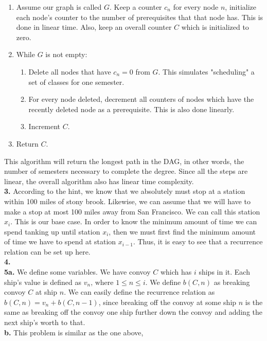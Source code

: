 \documentclass[12pt]{report}
\newcommand{\no}{\noindent}
\begin{document}
	\begin{enumerate}
		\item Assume our graph is called $G$. Keep a counter $c_n$ for every node $n$, initialize each node's counter to the number of prerequisites that that node has. This is done in linear time. Also, keep an overall counter $C$ which is initialized to zero.
		\item While $G$ is not empty:
		\begin{enumerate}
			\item Delete all nodes that have $c_n = 0$ from $G$. This simulates "scheduling" a set of classes for one semester.
			\item For every node deleted, decrement all counters of nodes which have the recently deleted node as a prerequisite. This is also done linearly.
			\item Increment $C$.
		\end{enumerate}
		\item Return $C$.
	\end{enumerate} 

	\no This algorithm will return the longest path in the DAG, in other words, the number of semesters necessary to complete the degree. Since all the steps are linear, the overall algorithm also has linear time complexity.\\

	\no \textbf{3.} According to the hint, we know that we absolutely must stop at a station within 100 miles of stony brook. Likewise, we can assume that we will have to make a stop at most 100 miles away from San Francisco. We can call this station $x_i$. This is our base case. In order to know the minimum amount of time we can spend tanking up until station $x_i$, then we must first find the minimum amount of time we have to spend at station $x_{i-1}$. Thus, it is easy to see that a recurrence relation can be set up here.\\

	\no \textbf{4.}\\
	
	\no \textbf{5a.} We define some variables. We have convoy $C$ which has $i$ ships in it. Each ship's value is defined as $v_n\text{, where }1 \leq n \leq i.$ We define $b(C,n)$ as breaking convoy $C$ at ship $n$. We can easily define the recurrence relation as $b(C,n) = v_n + b(C,n-1)$, since breaking off the convoy at some ship $n$ is the same as breaking off the convoy one ship further down the convoy and adding the next ship's worth to that.\\

	\no \textbf{b.} This problem is similar as the one above, 
\end{document}
